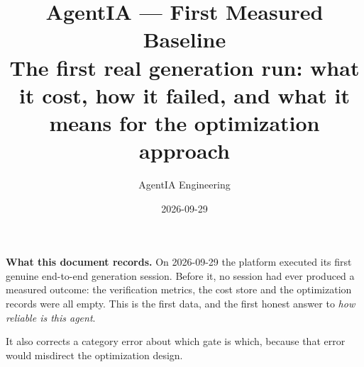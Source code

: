 \documentclass[11pt,a4paper]{article}
\title{\vspace{-1.4cm}\textbf{AgentIA --- First Measured Baseline}\\[0.25cm]
\large The first real generation run: what it cost, how it failed, and what it means
for the optimization approach}
\author{AgentIA Engineering}
\date{2026-09-29}
\begin{document}
\maketitle
\thispagestyle{fancy}

\begin{notebox}
\textbf{What this document records.} On 2026-09-29 the platform executed its first
genuine end-to-end generation session. Before it, no session had ever produced a
measured outcome: the verification metrics, the cost store and the optimization
records were all empty. This is the first data, and the first honest answer to
\emph{how reliable is this agent}.

It also corrects a category error about which gate is which, because that error
would misdirect the optimization design.
\end{notebox}
\end{document}
